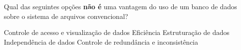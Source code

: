 \documentclass[12pt, addpoints]{exam}
\begin{document}
    \begin{questions}

    \newpage
    \question
Qual das seguintes opções \textbf{não é} uma vantagem do uso de um banco de
dados sobre o sistema de arquivos convencional?

\begin{choices}
\choice Controle de acesso e visualização de dados
\choice Eficiência
\choice Estruturação de dados
\choice Independência de dados
\choice Controle de redundância e inconsistência
\end{choices}



    \end{questions}
    
\end{document}

